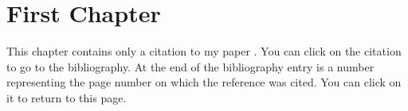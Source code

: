 \documentclass{report}
\begin{document}
    \chapter{First Chapter}
    This chapter contains only a citation to my paper \cite{whitaker:20:mwf}.
    You can click on the citation to go to the bibliography.
    At the end of the bibliography entry
    is a number representing the page number
    on which the reference was cited.
    You can click on it to return to this page.

    
    
\end{document}
